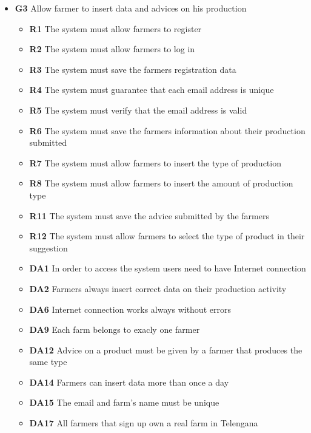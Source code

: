 \begin{itemize}
\item \textbf{G3} Allow farmer to insert data and advices on his production
    \begin{itemize}
    \renewcommand\labelitemi{--}
    \item \textbf{R1} The system must allow farmers to register
    \item \textbf{R2} The system must allow farmers to log in
    \item \textbf{R3} The system must save the farmers registration data
    \item \textbf{R4} The system must guarantee that each email address is unique
    \item \textbf{R5} The system must verify that the email address is valid
    \item \textbf{R6} The system must save the farmers information about their production submitted
    \item \textbf{R7} The system must allow farmers to insert the type of production
    \item \textbf{R8} The system must allow farmers to insert the amount of production type
    \item \textbf{R11} The system must save the advice submitted by the farmers
    \item \textbf{R12} The system must allow farmers to select the type of product in their suggestion
    \item \textbf{DA1} In order to access the system users need to have Internet connection
    \item \textbf{DA2} Farmers always insert correct data on their production activity
    \item \textbf{DA6} Internet connection works always without errors
    \item \textbf{DA9} Each farm belongs to exacly one farmer
    \item \textbf{DA12} Advice on a product must be given by a farmer that produces the same type
    \item \textbf{DA14} Farmers can insert data more than once a day
    \item \textbf{DA15} The email and farm's name must be unique
    \item \textbf{DA17} All farmers that sign up own a real farm in Telengana
    \end{itemize} 


\end{itemize}
